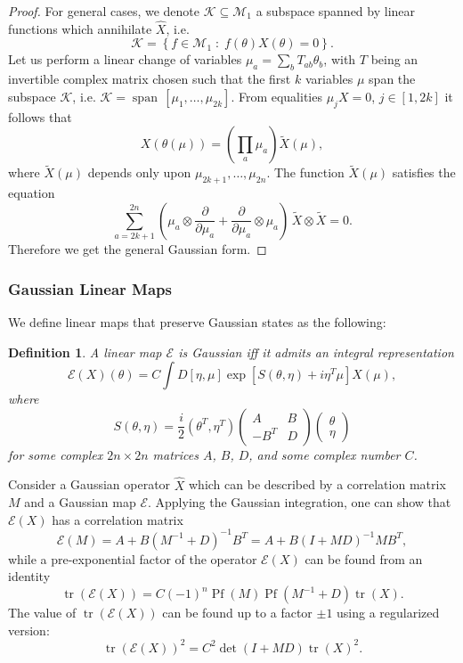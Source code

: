\documentclass[aps,prx,superscriptaddress,nofootinbib]{revtex4}
\def \tr{\operatorname{tr}}
\def \Pf{\operatorname{Pf}}
\newtheorem{definition}{Definition}
\begin{document}
\begin{proof}
For general cases, we denote $\mathcal K \subseteq \mathcal M_1$ a subspace spanned by linear functions which annihilate $\hat X$, i.e.
$$
\mathcal K=\left\{ f \in \mathcal M_1 \; : \; f(\theta)X(\theta)=0\right\}.
$$
Let us perform a linear change of variables $\mu_a=\sum_b T_{ab} \theta_b$, with $T$ being an invertible complex matrix chosen such  that the first $k$ variables $\mu$ span the subspace $\mathcal K$, i.e. $\mathcal K=\operatorname{span}\, [ \mu_1,\ldots,\mu_{2k}]$. From equalities $\mu_j X=0$, $j\in [1,2k]$ it follows that 
$$
X(\theta(\mu))=\left(\prod_a \mu_a \right) \tilde{X}(\mu),
$$
where $\tilde{X}(\mu)$ depends only upon $\mu_{2k+1},\ldots,\mu_{2n}$. The function $\tilde{X}(\mu)$ satisfies the equation
$$
\sum_{a=2k+1}^{2n}\left(\mu_a\otimes \frac{\partial}{\partial\mu_a} + \frac{\partial}{\partial\mu_a}\otimes \mu_a\right)\, \tilde{X}\otimes \tilde{X}=0.
$$
Therefore we get the general Gaussian form.
\end{proof}

\subsubsection{Gaussian Linear Maps}
We define linear maps that preserve Gaussian states as the following:
\begin{definition}
A linear map $\mathcal E$ is Gaussian iff it admits an integral  representation
\begin{equation}
	\mathcal E(X)(\theta) = C \int D[\eta,\mu] \exp{\left[ S(\theta,\eta) + i\eta^T \mu \right]} X(\mu),
\end{equation}
where
\begin{equation}
	S(\theta,\eta)= \frac{i}{2} (\theta^T,\eta^T)
	\begin{pmatrix}
		A & B \\ -B^T & D
	\end{pmatrix}
	\begin{pmatrix}
		\theta \\ \eta
	\end{pmatrix}
\end{equation}
for some complex  $2n\times 2n$ matrices $A$, $B$, $D$, and some complex number $C$.
\end{definition}
Consider a Gaussian operator $\hat X$ which can be described by a correlation matrix $M$ and a Gaussian map $\mathcal E$. Applying the Gaussian integration, one can show that $\mathcal E(X)$ has a correlation matrix
$$
\mathcal E(M) = A + B \left(M^{-1} + D \right)^{-1} B^T = A + B \left(I + MD \right)^{-1} M B^T,
$$
while a pre-exponential factor of the operator $\mathcal E(X)$ can be found from an  identity
$$
\tr{ \left(\mathcal E(X)\right)} = C (-1)^n \Pf(M) \Pf(M^{-1}+D) \tr{(X)}.
$$
The value of $\tr{(\mathcal E(X))}$ can be found up to a factor $\pm 1$ using a regularized version:
$$
\tr{ \left( \mathcal E(X) \right) }^2 = C^2 \det{\left( I + M D \right) } \tr{(X)}^2.
$$
\end{document}
